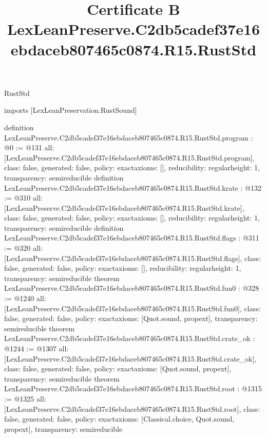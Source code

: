 \begin{lexlean}{RustStd}
\title{Certificate B LexLeanPreserve.C2db5cadef37e16ebdaceb807465c0874.R15.RustStd}
\begin{coremodule}
imports [LexLeanPreservation.RustSound]

definition LexLeanPreserve.C2db5cadef37e16ebdaceb807465c0874.R15.RustStd.program : @0 := @131 {
  all: [LexLeanPreserve.C2db5cadef37e16ebdaceb807465c0874.R15.RustStd.program],
  class: false,
  generated: false,
  policy: exact{axioms: []},
  reducibility: regular{height: 1},
  transparency: semireducible
}
definition LexLeanPreserve.C2db5cadef37e16ebdaceb807465c0874.R15.RustStd.krate : @132 := @310 {
  all: [LexLeanPreserve.C2db5cadef37e16ebdaceb807465c0874.R15.RustStd.krate],
  class: false,
  generated: false,
  policy: exact{axioms: []},
  reducibility: regular{height: 1},
  transparency: semireducible
}
definition LexLeanPreserve.C2db5cadef37e16ebdaceb807465c0874.R15.RustStd.flags : @311 := @320 {
  all: [LexLeanPreserve.C2db5cadef37e16ebdaceb807465c0874.R15.RustStd.flags],
  class: false,
  generated: false,
  policy: exact{axioms: []},
  reducibility: regular{height: 1},
  transparency: semireducible
}
theorem LexLeanPreserve.C2db5cadef37e16ebdaceb807465c0874.R15.RustStd.fun0 : @328 := @1240 {
  all: [LexLeanPreserve.C2db5cadef37e16ebdaceb807465c0874.R15.RustStd.fun0],
  class: false,
  generated: false,
  policy: exact{axioms: [Quot.sound, propext]},
  transparency: semireducible
}
theorem LexLeanPreserve.C2db5cadef37e16ebdaceb807465c0874.R15.RustStd.crate_ok : @1244 := @1307 {
  all: [LexLeanPreserve.C2db5cadef37e16ebdaceb807465c0874.R15.RustStd.crate_ok],
  class: false,
  generated: false,
  policy: exact{axioms: [Quot.sound, propext]},
  transparency: semireducible
}
theorem LexLeanPreserve.C2db5cadef37e16ebdaceb807465c0874.R15.RustStd.root : @1315 := @1325 {
  all: [LexLeanPreserve.C2db5cadef37e16ebdaceb807465c0874.R15.RustStd.root],
  class: false,
  generated: false,
  policy: exact{axioms: [Classical.choice, Quot.sound, propext]},
  transparency: semireducible
}


\end{coremodule}
\end{lexlean}
